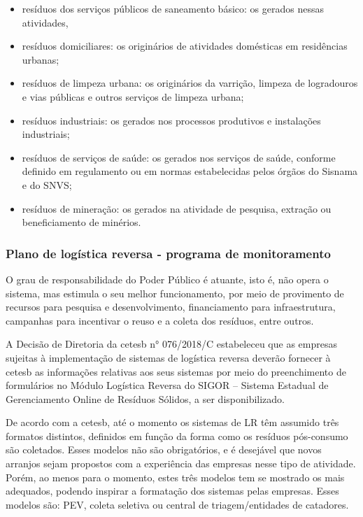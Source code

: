 \begin{itemize}
	\item resíduos dos serviços públicos de saneamento básico: os gerados nessas atividades, 
	\item resíduos domiciliares: os originários de atividades domésticas em residências urbanas; 
	\item resíduos de limpeza urbana: os originários da varrição, limpeza de logradouros e vias públicas e
	outros serviços de limpeza urbana; 
	\item resíduos industriais: os gerados nos processos produtivos e instalações industriais;  
	\item resíduos de serviços de saúde: os gerados nos serviços de saúde, conforme definido em regulamento ou em normas estabelecidas pelos órgãos do Sisnama e do SNVS; 
	\item resíduos de mineração: os gerados na atividade de pesquisa, extração ou beneficiamento de
	minérios.
\end{itemize}


\subsubsection{Plano de logística reversa - programa de monitoramento}
O grau de responsabilidade do Poder Público é atuante, isto é, não opera o sistema, mas estimula o seu melhor funcionamento, por meio de provimento de recursos para pesquisa e desenvolvimento, financiamento para infraestrutura, campanhas para incentivar o reuso e a coleta dos resíduos, entre outros.

A Decisão de Diretoria da \gls{cetesb} n° 076/2018/C estabeleceu que as empresas sujeitas à implementação de sistemas de logística reversa deverão fornecer à \gls{cetesb} as informações relativas aos seus sistemas por meio do preenchimento de formulários no Módulo Logística Reversa do SIGOR – Sistema Estadual de Gerenciamento Online de Resíduos Sólidos, a ser disponibilizado.

De acordo com a \gls{cetesb}, até o momento os sistemas de LR têm assumido três formatos distintos, definidos em função da forma como os resíduos pós-consumo são coletados. Esses modelos não são obrigatórios, e é desejável que novos arranjos sejam propostos com a experiência das empresas nesse tipo de atividade. Porém, ao menos para o momento, estes três modelos tem se mostrado os mais adequados, podendo inspirar a formatação dos sistemas pelas empresas. Esses modelos são: PEV, coleta seletiva ou central de triagem/entidades de catadores. 

